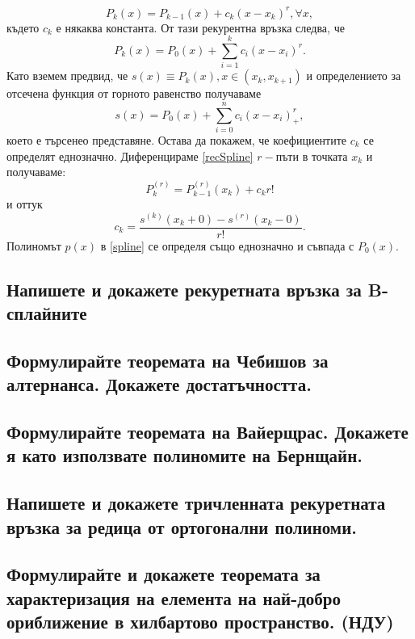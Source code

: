 \documentclass[12pt]{article}
\numberwithin{equation}{subsection}
\numberwithin{theorem}{subsection}
\numberwithin{definition}{subsection}
\numberwithin{corollary}{subsection}
\begin{document}
  \begin{equation}\label{recSpline}
    P_k(x)=P_{k-1}(x)+c_k(x-x_k)^r, \forall x,
  \end{equation}
  където $c_k$ е някаква константа. От тази рекурентна връзка следва, че 
  \begin{equation*}
    P_k(x)=P_0(x)+\sum_{i=1}^{k}c_i(x-x_i)^r.
  \end{equation*}
  Като вземем предвид, че $s(x)\equiv P_k(x), x\in(x_k,x_{k+1})$ и определението за отсечена функция от горното равенство получаваме
  \begin{equation*}
    s(x)=P_0(x)+\sum_{i=0}^{n}c_i(x-x_i)_+^r,
  \end{equation*}
  което е търсенео представяне. Остава да покажем, че коефициентите $c_k$ се определят еднозначно.
  Диференцираме \ref{recSpline} $r-$пъти в точката $x_k$ и получаваме:
  \begin{equation*}
    P^{(r)}_k=P_{k-1}^{(r)}(x_k)+c_kr!
  \end{equation*}
  и оттук
  \begin{equation*}
    c_k=\frac{s^{(k)}(x_k+0)-s^{(r)}(x_k-0)}{r!}.
  \end{equation*}
  Полиномът $p(x)$ в \ref{spline} се определя също еднозначно и съвпада с $P_0(x).$
\subsection{Напишете и докажете рекуретната връзка за B-сплайните}

\subsection{Формулирайте теоремата на Чебишов за алтернанса. Докажете достатъчността.}

\subsection{Формулирайте теоремата на Вайерщрас. Докажете я като използвате полиномите на Бернщайн.}

\subsection{Напишете и докажете тричленната рекуретната връзка за редица от ортогонални полиноми.}

\subsection{Формулирайте и докажете теоремата за характеризация на елемента на най-добро ориближение в хилбартово пространство. (НДУ)}
\end{document}
